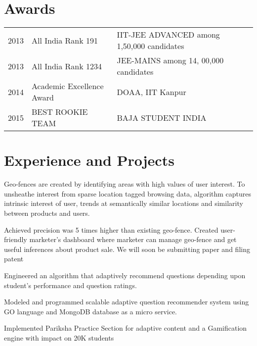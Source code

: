 \documentclass[]{deedy-resume-openfont}
\begin{document}
\hfill
\begin{minipage}[t]{0.66\textwidth} 


\section{Awards} 
\begin{tabular}{rll}
	2013 & All India Rank 191 & IIT-JEE ADVANCED among 1,50,000 candidates \\
	2013 & All India Rank 1234 & JEE-MAINS among 14, 00,000 candidates \\ 
	2014 & Academic Excellence Award & DOAA, IIT Kanpur \\
	2015 & BEST ROOKIE TEAM  & BAJA STUDENT INDIA \\ 
\end{tabular}
\sectionsep

\section{Experience and Projects}

\vspace{\topsep} %
\begin{tightemize}
\item Geo-fences are created by identifying areas with high values of user interest. To unsheathe interest from sparse location tagged browsing data, algorithm captures intrinsic interest of user, trends at semantically similar locations and similarity between products and users.

\item Achieved precision was 5 times higher than existing geo-fence. Created user-friendly marketer’s dashboard where marketer can manage geo-fence and get useful inferences about product sale. We will soon be submitting paper and filing patent
\end{tightemize}
\sectionsep

\begin{tightemize}
\item Engineered an algorithm that adaptively recommend questions depending upon student’s performance and question ratings.
\item Modeled and programmed scalable adaptive question recommender system using GO language and MongoDB database as a micro service.
\item Implemented Pariksha Practice Section for adaptive content and a Gamification engine with impact on 20K students
\end{tightemize}


\end{minipage}
\end{document}
